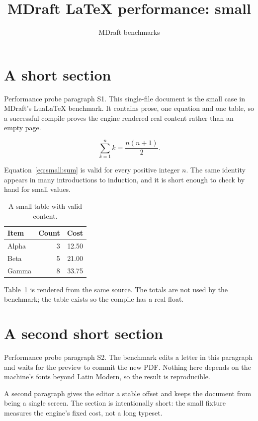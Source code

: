 \documentclass[11pt]{article}
\title{MDraft LaTeX performance: small}
\author{MDraft benchmarks}
\date{}
\begin{document}
\maketitle

\section{A short section}
\label{sec:small}

Performance probe paragraph S1. This single-file document is the small case in
MDraft's LuaLaTeX benchmark. It contains prose, one equation and one table, so
a successful compile proves the engine rendered real content rather than an
empty page.

\begin{equation}
  \label{eq:small:sum}
  \sum_{k=1}^{n} k = \frac{n(n+1)}{2}.
\end{equation}

Equation~\ref{eq:small:sum} is valid for every positive integer $n$. The same
identity appears in many introductions to induction, and it is short enough to
check by hand for small values.

\begin{table}[h]
  \centering
  \begin{tabular}{lrr}
    \toprule
    Item & Count & Cost \\
    \midrule
    Alpha & 3 & 12.50 \\
    Beta  & 5 & 21.00 \\
    Gamma & 8 & 33.75 \\
    \bottomrule
  \end{tabular}
  \caption{A small table with valid content.}
  \label{tab:small:costs}
\end{table}

Table~\ref{tab:small:costs} is rendered from the same source. The totals are
not used by the benchmark; the table exists so the compile has a real float.

\section{A second short section}
Performance probe paragraph S2. The benchmark edits a letter in this paragraph
and waits for the preview to commit the new PDF. Nothing here depends on the
machine's fonts beyond Latin Modern, so the result is reproducible.

A second paragraph gives the editor a stable offset and keeps the document from
being a single screen. The section is intentionally short: the small fixture
measures the engine's fixed cost, not a long typeset.
\end{document}
